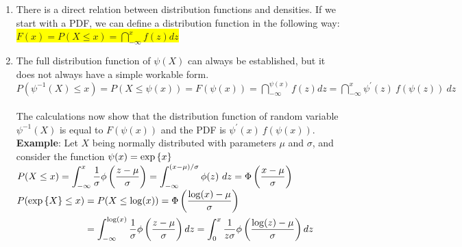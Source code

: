 \begin{enumerate}
    \item There is a direct relation between distribution functions and densities.
    If we start with a PDF, we can define a distribution function in the following way:
    \colorbox{yellow}{$
        F(x)
        = P(X \leq x)
        = \dint_{-\infty}^{x} f(z) dz
    $}
    \hfill \cite{statistics/book/Statistics-for-Data-Scientists/Maurits-Kaptein}

    \item The full distribution function of $\psi(X)$ can always be established, but it does not always have a simple workable form.
    \hfill \cite{statistics/book/Statistics-for-Data-Scientists/Maurits-Kaptein}
    \\[0.2cm]
    $
        P(\psi^{-1}(X) \leq x)
        = P(X \leq \psi(x))
        = F(\psi(x))
        =\dint_{-\infty}^{\psi(x)} f(z) dz
        =\dint_{-\infty}^{x} \psi^{\prime}(z)\ f(\psi(z))\ dz
    $
    \hfill \cite{statistics/book/Statistics-for-Data-Scientists/Maurits-Kaptein}
    \\[0.2cm]
    The calculations now show that the distribution function of random variable $\psi^{-1}(X)$ is equal to $F(\psi(x))$ and the PDF is $\psi^\prime(x)\ f (\psi(x))$.
    \hfill \cite{statistics/book/Statistics-for-Data-Scientists/Maurits-Kaptein}
    \\[0.5cm]
    \textbf{Example}: Let $X$ being normally distributed with parameters $\mu$ and $\sigma$, and consider the function $\psi(x) = \exp\left\{x\right\}$
    \hfill \cite{statistics/book/Statistics-for-Data-Scientists/Maurits-Kaptein}
    \\[0.2cm]
    $
        P(X \leq x)
        = \displaystyle\int_{-\infty}^{x} \dfrac{1}{\sigma} \phi\left(\dfrac{z - \mu}{\sigma}\right)
        = \displaystyle\int_{-\infty}^{(x - \mu)/\sigma} \phi(z)\ dz
        = \Phi\left(\dfrac{x - \mu}{\sigma}\right)
    $
    \hfill \cite{statistics/book/Statistics-for-Data-Scientists/Maurits-Kaptein}
    \\[0.2cm]
    $
        \begin{aligned}
            P(\exp\left\{X\right\} \leq x)
                &= P(X \leq \log(x))
                = \Phi\left(\dfrac{\log(x) - \mu}{\sigma}\right) \\
                &= \displaystyle\int_{-\infty}^{\log(x)} \dfrac{1}{\sigma} \phi\left(\dfrac{z - \mu}{\sigma}\right) dz
                = \displaystyle\int_{0}^{x} \dfrac{1}{z\sigma} \phi\left(\dfrac{\log(z) - \mu}{\sigma}\right) dz
        \end{aligned}
    $
    \hfill \cite{statistics/book/Statistics-for-Data-Scientists/Maurits-Kaptein}





\end{enumerate}
